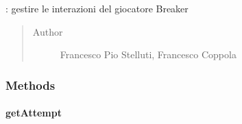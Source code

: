 \documentclass[letterpaper,10pt,italian,openany,oneside]{sphinxmanual}
\begin{document}
\begin{fulllineitems}
\label{\detokenize{source/it/unicam/cs/pa/mastermind/players/CodeBreaker:it.unicam.cs.pa.mastermind.players.CodeBreaker}}
: gestire le interazioni del giocatore Breaker
\begin{quote}\begin{description}
\item[{Author}] \leavevmode
Francesco Pio Stelluti, Francesco Coppola

\end{description}\end{quote}

\end{fulllineitems}



\subsubsection{Methods}
\label{\detokenize{source/it/unicam/cs/pa/mastermind/players/CodeBreaker:methods}}

\paragraph{getAttempt}
\label{\detokenize{source/it/unicam/cs/pa/mastermind/players/CodeBreaker:getattempt}}
\end{document}
